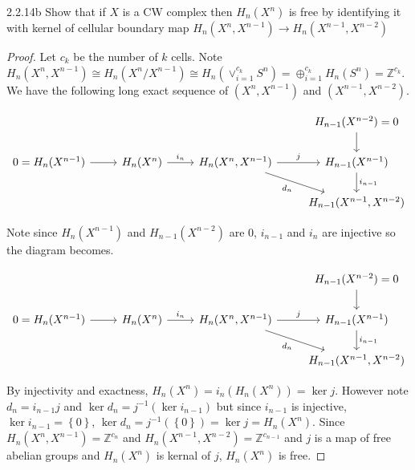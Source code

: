 \documentclass{article}
\newcommand{\Z}{\mathbb{Z}}
\begin{document}
\begin{PROB}{2.2.14b}\label{Problem 2.2.14b.}
    Show that if $X$ is a CW complex then $H_n(X^n)$ is free by identifying it with kernel of cellular boundary map $H_n(X^n , X^{n - 1}) \to H_n(X^{n - 1}, X^{n - 2})$   
\end{PROB}
\begin{proof}
    Let $c_k$ be the number of $k$ cells.
    Note $H_n(X^n , X^{n - 1}) \cong H_n(X^n / X^{n - 1}) \cong H_n(\vee_{i = 1}^{c_k} S^n) = \oplus_{i = 1}^{c_k} H_n(S^n) = \Z^{c_k}$. We have the following long exact sequence of $(X^n , X^{n - 1})$ and $(X^{n - 1} , X^{n - 2})$. 
    
\[\begin{tikzcd}
	&&& {H_{n-1}(X^{n-2})=0} \\
	{0=H_n(X^{n-1})} & {H_n(X^n)} & {H_n(X^n,X^{n-1})} & {H_{n-1}(X^{n-1})} \\
	&&& {H_{n-1}(X^{n-1},X^{n-2})}
	\arrow[from=1-4, to=2-4]
	\arrow[from=2-1, to=2-2]
	\arrow["{i_n}", from=2-2, to=2-3]
	\arrow["j", from=2-3, to=2-4]
	\arrow["{d_n}"', from=2-3, to=3-4]
	\arrow["{i_{n-1}}", from=2-4, to=3-4]
\end{tikzcd}\]

    Note since $H_n(X^{n - 1})$ and $H_{n - 1}(X^{n - 2})$ are 0, $i_{n - 1}$ and $i_n$ are injective so the diagram becomes. 
    
\[\begin{tikzcd}
	&&& {H_{n-1}(X^{n-2})=0} \\
	{0=H_n(X^{n-1})} & {H_n(X^n)} & {H_n(X^n,X^{n-1})} & {H_{n-1}(X^{n-1})} \\
	&&& {H_{n-1}(X^{n-1},X^{n-2})}
	\arrow[from=1-4, to=2-4]
	\arrow[from=2-1, to=2-2]
	\arrow["{i_n}", from=2-2, to=2-3]
	\arrow["j", from=2-3, to=2-4]
	\arrow["{d_n}"', from=2-3, to=3-4]
	\arrow["{i_{n-1}}", from=2-4, to=3-4]
\end{tikzcd}\]


    By injectivity and exactness, $H_n(X^n) = i_n(H_n(X^n)) = \ker j$. However note $d_n = i_{n - 1} j$ and $\ker d_n = j^{-1}(\ker i_{n - 1})$ but since $i_{n - 1}$ is injective, $\ker i_{n - 1} = \left\{ 0 \right\}$, $\ker d_n = j^{-1}(\left\{ 0 \right\}) = \ker j = H_n(X^n)$. Since $H_n(X^n, X^{n - 1}) = \Z^{c_n}$ and $H_n(X^{n - 1}, X^{n - 2}) = \Z^{c_{n - 1}}$ and $j$ is a map of free abelian groups and $H_n(X^n)$ is kernal of $j$, $H_n(X^n)$ is free.        
\end{proof}
\end{document}

